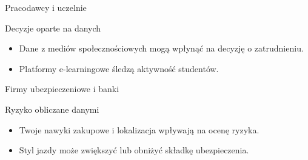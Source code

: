     
    \begin{frame}{Pracodawcy i uczelnie}
    \begin{alertblock}{Decyzje oparte na danych}
        \begin{itemize}
          \item Dane z mediów społecznościowych mogą wpłynąć na decyzję o zatrudnieniu.\cite{DIGITAL_GLOBAL}
          \item Platformy e-learningowe śledzą aktywność studentów.
        \end{itemize}
    \end{alertblock}
    \end{frame}
    
    \begin{frame}{Firmy ubezpieczeniowe i banki}
    \begin{alertblock}{Ryzyko obliczane danymi}
        \begin{itemize}
          \item Twoje nawyki zakupowe i lokalizacja wpływają na ocenę ryzyka.
          \item Styl jazdy może zwiększyć lub obniżyć składkę ubezpieczenia.
        \end{itemize}
    \end{alertblock}
    \end{frame}
    
